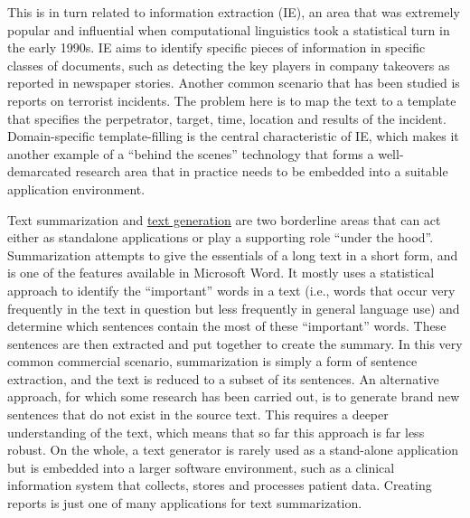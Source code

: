 \documentclass[]{../../metanetpaper}
\begin{document}
\begin{multicols}{2}
This is in turn related to information extraction (IE), an area that was
extremely popular and influential when computational linguistics took a
statistical turn in the early 1990s. IE aims to identify specific pieces of
information in specific classes of documents, such as detecting the key players
in company takeovers as reported in newspaper stories. Another common scenario
that has been studied is reports on terrorist incidents. The problem here is to
map the text to a template that specifies the perpetrator, target, time,
location and results of the incident. Domain-specific template-filling is the
central characteristic of IE, which makes it another example of a “behind the
scenes” technology that forms a well-demarcated research area that in practice
needs to be embedded into a suitable application environment.


Text summarization and \underline{text generation} are two borderline areas that can act
either as standalone applications or play a supporting role “under the hood”.
Summarization attempts to give the essentials of a long text in a short form,
and is one of the features available in Microsoft Word. It mostly uses a
statistical approach to identify the “important” words in a text (i.e., words
that occur very frequently in the text in question but less frequently in
general language use) and determine which sentences contain the most of these
“important” words. These sentences are then extracted and put together to
create the summary. In this very common commercial scenario, summarization is
simply a form of sentence extraction, and the text is reduced to a subset of
its sentences. An alternative approach, for which some research has been
carried out, is to generate brand new sentences that do not exist in the source
text. This requires a deeper understanding of the text, which means that so far
this approach is far less robust. On the whole, a text generator is rarely used
as a stand-alone application but is embedded into a larger software
environment, such as a clinical information system that collects, stores and
processes patient data. Creating reports is just one of many applications for
text summarization.


\end{multicols}
\end{document}
